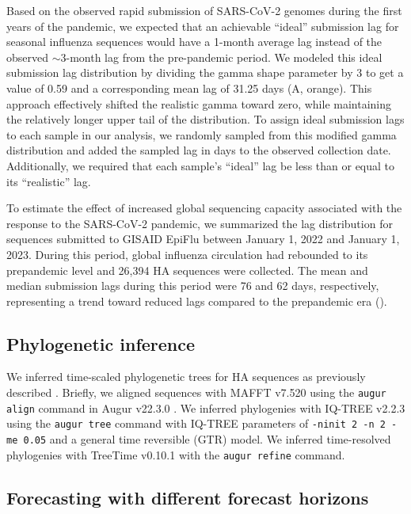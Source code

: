 \documentclass[9pt,lineno]{elife}
\begin{document}
Based on the observed rapid submission of SARS-CoV-2 genomes during the first years of the pandemic, we expected that an achievable ``ideal'' submission lag for seasonal influenza sequences would have a 1-month average lag instead of the observed $\sim$3-month lag from the pre-pandemic period.
We modeled this ideal submission lag distribution by dividing the gamma shape parameter by 3 to get a value of 0.59 and a corresponding mean lag of 31.25 days (A, orange).
This approach effectively shifted the realistic gamma toward zero, while maintaining the relatively longer upper tail of the distribution.
To assign ideal submission lags to each sample in our analysis, we randomly sampled from this modified gamma distribution and added the sampled lag in days to the observed collection date.
Additionally, we required that each sample's ``ideal'' lag be less than or equal to its ``realistic'' lag.

To estimate the effect of increased global sequencing capacity associated with the response to the SARS-CoV-2 pandemic, we summarized the lag distribution for sequences submitted to GISAID EpiFlu between January 1, 2022 and January 1, 2023.
During this period, global influenza circulation had rebounded to its prepandemic level and 26,394 HA sequences were collected.
The mean and median submission lags during this period were 76 and 62 days, respectively, representing a trend toward reduced lags compared to the prepandemic era ().

\subsection{Phylogenetic inference}

We inferred time-scaled phylogenetic trees for HA sequences as previously described \citep{Huddleston2020}.
Briefly, we aligned sequences with MAFFT v7.520 \citep{Katoh2002,Katoh2013} using the \texttt{augur align} command in Augur v22.3.0 \citep{Huddleston2021}.
We inferred phylogenies with IQ-TREE v2.2.3 \citep{Nguyen2014} using the \texttt{augur tree} command with IQ-TREE parameters of \texttt{-ninit 2 -n 2 -me 0.05} and a general time reversible (GTR) model.
We inferred time-resolved phylogenies with TreeTime v0.10.1 \citep{Sagulenko2018} with the \texttt{augur refine} command.

\subsection{Forecasting with different forecast horizons}
\end{document}
